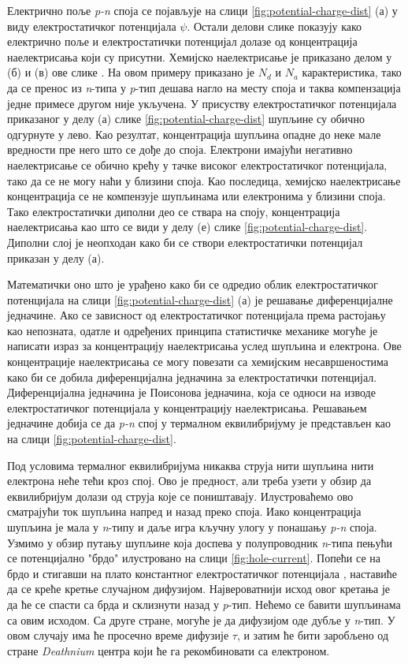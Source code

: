 \documentclass{article}
\begin{document}
Електрично поље \textit{p-n} споја се појављује на слици \ref{fig:potential-charge-dist} (а) у виду електростатичког потенцијала $\psi$. Остали делови слике показују како електрично поље и електростатички потенцијал долазе од концентрација наелектрисања који су присутни. Хемијско наелектрисање је приказано делом у (б) и (в) ове слике . На овом примеру приказано је $N_d$ и $N_a$ карактеристика, тако да се пренос из \textit{n}-типа у \textit{p}-тип дешава нагло на месту споја и таква компензација једне примесе другом није укључена. У присуству електростатичког потенцијала приказаног у делу (а) слике \ref{fig:potential-charge-dist} шупљине су обично одгурнуте у лево. Као резултат, концентрација шупљина опадне до неке мале вредности пре него што се дође до споја. Електрони имајући негативно наелектрисање се обично крећу у тачке високог електростатичког потенцијала, тако да се не могу наћи у близини споја. Као последица, хемијско наелектрисање концентрација се не компензује шупљинама или електронима у близини споја. Тако електростатички диполни део се ствара на споју, концентрација наелектрисања као што се види у делу (е) слике \ref{fig:potential-charge-dist}. Диполни слој је неопходан како би се створи електростатички потенцијал приказан у делу (а).

Математички оно што је урађено како би се одредио облик електростатичког потенцијала на слици \ref{fig:potential-charge-dist} (а) је решавање диференцијалне једначине. Ако се зависност од електростатичког потенцијала према растојању као непозната, одатле и одређених принципа статистичке механике могуће је написати израз за концентрацију наелектрисања услед шупљина и електрона. Ове концентрације наелектрисања се могу повезати са хемијским несавршеностима како би се добила диференцијална једначина за електростатички потенцијал. Диференцијална једначина је Поисонова једначина, која се односи на изводе електростатичког потенцијала у концентрацију наелектрисања. Решавањем једначине добија се да \textit{p-n} спој у термалном еквилибријуму је представљен као на слици \ref{fig:potential-charge-dist}.

Под условима термалног еквилибријума никаква струја нити шупљина нити електрона неће тећи кроз спој. Ово је предност, али треба узети у обзир да еквилибријум долази од струја које се поништавају. Илустроваћемо ово сматрајући ток шупљина напред и назад преко споја. Иако концентрација шупљина је мала у \textit{n}-типу и даље игра кључну улогу у понашању \textit{p-n} споја. Узмимо у обзир путању шупљине која доспева у полупроводник \textit{n}-типа пењући се потенцијално "брдо" илустровано на слици \ref{fig:hole-current}. Попећи се на брдо и стигавши на плато константног електростатичког потенцијала , наставиће да се креће кретње случајном дифузијом. Највероватнији исход овог кретања је да ће се спасти са брда и склизнути назад у \textit{p}-тип. Нећемо се бавити шупљинама са овим исходом. Са друге стране, могуће је да дифузијом оде дубље у \textit{n}-тип. У овом случају има ће просечно време дифузије $\tau$, и затим ће бити заробљено од стране \textit{Deathnium} центра који ће га рекомбиновати са електроном.
\end{document}
